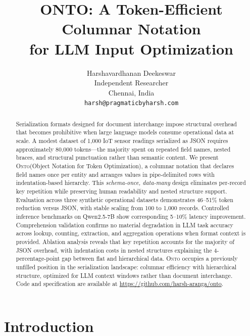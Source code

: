 \documentclass[10pt,twocolumn]{article}
\title{\vspace{-1em}\textbf{ONTO: A Token-Efficient Columnar Notation\\for LLM Input Optimization}\vspace{-0.5em}}
\author{
    Harshavardhanan Deekeswar\\
    Independent Researcher\\
    Chennai, India\\
    \texttt{harsh@pragmaticbyharsh.com}
}
\date{}
\newcommand{\onto}{\textsc{Onto}\xspace}
\begin{document}
\maketitle
\thispagestyle{empty}

\begin{abstract}
\noindent Serialization formats designed for document interchange impose structural overhead that becomes prohibitive when large language models consume operational data at scale. A modest dataset of 1,000 IoT sensor readings serialized as JSON requires approximately 80,000 tokens---the majority spent on repeated field names, nested braces, and structural punctuation rather than semantic content. We present \onto (Object Notation for Token Optimization), a columnar notation that declares field names once per entity and arranges values in pipe-delimited rows with indentation-based hierarchy. This \emph{schema-once, data-many} design eliminates per-record key repetition while preserving human readability and nested structure support. Evaluation across three synthetic operational datasets demonstrates 46--51\% token reduction versus JSON, with stable scaling from 100 to 1,000 records. Controlled inference benchmarks on Qwen2.5-7B show corresponding 5--10\% latency improvement. Comprehension validation confirms no material degradation in LLM task accuracy across lookup, counting, extraction, and aggregation operations when format context is provided. Ablation analysis reveals that key repetition accounts for the majority of JSON overhead, with indentation costs in nested structures explaining the 4-percentage-point gap between flat and hierarchical data. \onto occupies a previously unfilled position in the serialization landscape: columnar efficiency with hierarchical structure, optimized for LLM context windows rather than document interchange. Code and specification are available at \url{https://github.com/harsh-aranga/onto}.
\end{abstract}

\section{Introduction}
\end{document}
